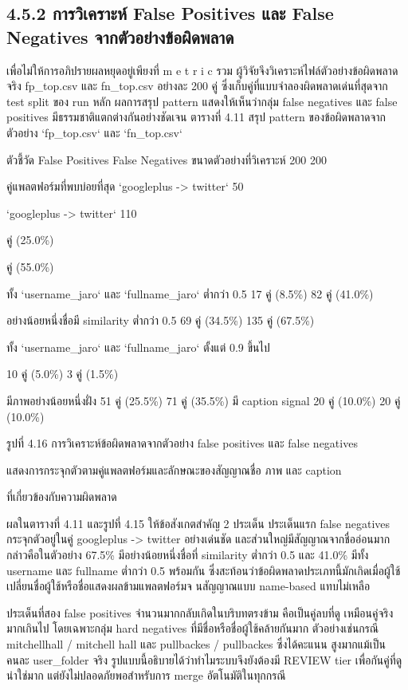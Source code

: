 \documentclass[12pt,a4paper]{report}
\begin{document}
\subsection*{4.5.2 การวิเคราะห์ False Positives และ False Negatives จากตัวอย่างข้อผิดพลาด}
เพื่อไม่ให้การอภิปรายผลหยุดอยู่เพียงที่ m e t r i c รวม ผู้วิจัยจึงวิเคราะห์ไฟล์ตัวอย่างข้อผิดพลาดจริง fp\_top.csv และ fn\_top.csv อย่างละ 200 คู่ ซึ่งเก็บคู่ที่แบบจำลองผิดพลาดเด่นที่สุดจาก test split ของ run หลัก ผลการสรุป pattern แสดงให้เห็นว่ากลุ่ม false negatives และ false positives มีธรรมชาติแตกต่างกันอย่างชัดเจน ตารางที่ 4.11 สรุป pattern ของข้อผิดพลาดจากตัวอย่าง `fp\_top.csv` และ `fn\_top.csv`\par
ตัวชี้วัด False Positives False Negatives ขนาดตัวอย่างที่วิเคราะห์ 200 200\par
คู่แพลตฟอร์มที่พบบ่อยที่สุด `googleplus -> twitter` 50\par
`googleplus -> twitter` 110\par
คู่ (25.0\%)\par
คู่ (55.0\%)\par
\clearpage
ทั้ง `username\_jaro` และ `fullname\_jaro` ต่ำกว่า 0.5 17 คู่ (8.5\%) 82 คู่ (41.0\%)\par
อย่างน้อยหนึ่งชื่อมี similarity ต่ำกว่า 0.5 69 คู่ (34.5\%) 135 คู่ (67.5\%)\par
ทั้ง `username\_jaro` และ `fullname\_jaro` ตั้งแต่ 0.9 ขึ้นไป\par
10 คู่ (5.0\%) 3 คู่ (1.5\%)\par
มีภาพอย่างน้อยหนึ่งฝั่ง 51 คู่ (25.5\%) 71 คู่ (35.5\%) มี caption signal 20 คู่ (10.0\%) 20 คู่ (10.0\%)\par
\begin{center}\small รูปที่ 4.16 การวิเคราะห์ข้อผิดพลาดจากตัวอย่าง false positives และ false negatives\end{center}
แสดงการกระจุกตัวตามคู่แพลตฟอร์มและลักษณะของสัญญาณชื่อ ภาพ และ caption\par
ที่เกี่ยวข้องกับความผิดพลาด\par
ผลในตารางที่ 4.11 และรูปที่ 4.15 ให้ข้อสังเกตสำคัญ 2 ประเด็น ประเด็นแรก false negatives กระจุกตัวอยู่ในคู่ googleplus -> twitter อย่างเด่นชัด และส่วนใหญ่มีสัญญาณจากชื่ออ่อนมาก กล่าวคือในตัวอย่าง 67.5\% มีอย่างน้อยหนึ่งชื่อที่ similarity ต่ำกว่า 0.5 และ 41.0\% มีทั้ง username และ fullname ต่ำกว่า 0.5 พร้อมกัน ซึ่งสะท้อนว่าข้อผิดพลาดประเภทนี้มักเกิดเมื่อผู้ใช้เปลี่ยนชื่อผู้ใช้หรือชื่อแสดงผลข้ามแพลตฟอร์มจ นสัญญาณแบบ name-based แทบไม่เหลือ\par
ประเด็นที่สอง false positives จำนวนมากกลับเกิดในบริบทตรงข้าม คือเป็นคู่ลบที่ดู เหมือนคู่จริงมากเกินไป โดยเฉพาะกลุ่ม hard negatives ที่มีชื่อหรือชื่อผู้ใช้คล้ายกันมาก ตัวอย่างเช่นกรณี mitchellhall / mitchell hall และ pullbackes / pullbackes ซึ่งได้คะแนน สูงมากแม้เป็นคนละ user\_folder จริง รูปแบบนี้อธิบายได้ว่าทำไมระบบจึงยังต้องมี REVIEW tier เพื่อกันคู่ที่ดูน่าใช่มาก แต่ยังไม่ปลอดภัยพอสำหรับการ merge อัตโนมัติในทุกกรณี\par
\end{document}
